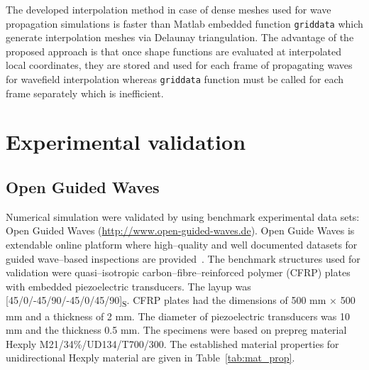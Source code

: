 \documentclass[preprint,12pt]{elsarticle}
\begin{document}
	The developed interpolation method in case of dense meshes used for wave propagation simulations is faster than Matlab embedded function \verb|griddata| which generate interpolation meshes via Delaunay triangulation. The advantage of the proposed approach is that once shape functions are evaluated at interpolated local coordinates, they are stored and used for each frame of propagating waves for wavefield interpolation whereas  \verb|griddata| function must be called for each frame separately which is inefficient.

	\section{Experimental validation}
	\subsection{Open Guided Waves}
	Numerical simulation were validated by using benchmark experimental data sets: Open Guided Waves (\url{http://www.open-guided-waves.de}). Open Guide Waves is extendable online platform where high--quality and well documented datasets for guided wave--based inspections are provided~\cite{Moll2018}. The benchmark structures used for validation were quasi--isotropic carbon--fibre--reinforced polymer (CFRP) plates with embedded piezoelectric transducers. The layup was [45/0/-45/90/-45/0/45/90]\textsubscript{S}. CFRP plates had the dimensions of 500 mm $\times$ 500 mm and a thickness of 2 mm. The diameter of piezoelectric transducers was 10 mm and the thickness 0.5 mm. The specimens were based on prepreg material Hexply\textsuperscript{\textregistered} M21/34\%/UD134/T700/300. The established material properties for unidirectional Hexply material are given in Table~\ref{tab:mat_prop}.
	
\end{document}
